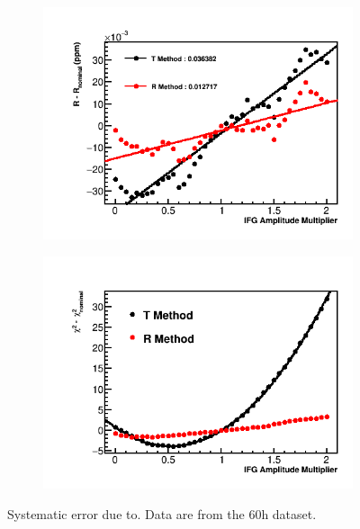 \begin{figure}[h]
\centering
    \begin{subfigure}[t]{0.45\textwidth}
        \centering
        \includegraphics[width=\textwidth]{IFG_Amplitude_Compare_R}
        \caption{}
    \end{subfigure}%
    \hspace{1cm}
    \begin{subfigure}[t]{0.45\textwidth}
        \centering
        \includegraphics[width=\textwidth]{IFG_Amplitude_Compare_Chisq.png}
        \caption{}
    \end{subfigure}
\caption[Systematic error due to]{Systematic error due to. Data are from the 60h dataset.}
\label{fig:IFGAmpscan}
\end{figure}





